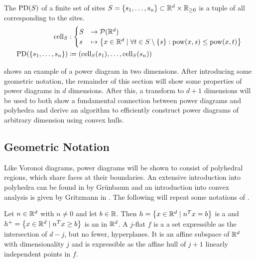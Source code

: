 \begin{definition}
    \label{def:powerdiagram}
    The  $\operatorname{PD}(S)$ of a finite set of sites $S = \left\{ s_1, \dots, s_n \right\} \subset \mathbb{R}^d \times \mathbb{R}_{\geq 0}$ is a tuple of all  corresponding to the sites.
    \begin{align}
        \operatorname{cell}_S &: \begin{cases}
            S &\to \mathcal{P}(\mathbb{R}^d)\\
            s &\mapsto \left\{ x \in \mathbb{R}^d \mid \forall t \in S \setminus \left\{ s \right\}: \operatorname{pow}(x, s) \leq \operatorname{pow}(x, t) \right\}
        \end{cases}\\
        \operatorname{PD}(\left\{ s_1, \dots, s_n \right\}) &\coloneqq \left( \operatorname{cell}_S(s_1), \dots, \operatorname{cell}_S(s_n) \right)
    \end{align}
\end{definition}

 shows an example of a power diagram in two dimensions.
After introducing some geometric notation, the remainder of this section will show some properties of power diagrams in $d$ dimensions.
After this, a transform to $d + 1$ dimensions will be used to both show a fundamental connection between power diagrams and polyhedra and derive an algorithm to efficiently construct power diagrams of arbitrary dimension using convex hulls.

\subsection{Geometric Notation}
\label{sub:geometric_notation}
Like Voronoi diagrams, power diagrams will be shown to consist of polyhedral regions, which share faces at their boundaries.
An extensive introduction into polyhedra can be found in \cite{grunbaum2003convex} by Grünbaum and an introduction into convex analysis is given by Gritzmann in \cite{gritzmann2013grundlagen}.
The following will repeat some notations of \cite{aurenhammer1987power}.

Let $n \in \mathbb{R}^d$ with $n \neq 0$ and let $b \in \mathbb{R}$.
Then $h = \left\{ x \in \mathbb{R}^d \mid n^T x = b \right\}$ is a  and $h^+ = \left\{ x \in \mathbb{R}^d \mid n^T x \geq b \right\}$ is an  in $\mathbb{R}^d$.
A $j$-flat $f$ is a a set expressible as the intersection of $d - j$, but no fewer, hyperplanes.
It is an affine subspace of $\mathbb{R}^d$ with dimensionality $j$ and is expressible as the affine hull of $j + 1$ linearly independent points in $f$.


